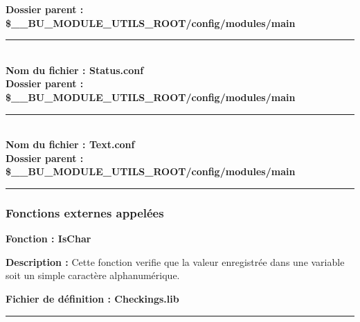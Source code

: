 \documentclass[a4paper,10pt]{article}
\begin{document}
\textbf{Dossier parent : \color{orange}\$\_\_BU\_MODULE\_UTILS\_ROOT\color{lime}/config/modules/main}\\[1\baselineskip]



\color{lime}\par\noindent\rule{\textwidth}{0.4pt}\color{white}\\[1\baselineskip]

\textbf{Nom du fichier : \color{lime}Status.conf}\\[1\baselineskip]

\textbf{Dossier parent : \color{orange}\$\_\_BU\_MODULE\_UTILS\_ROOT\color{lime}/config/modules/main}\\[1\baselineskip]



\color{lime}\par\noindent\rule{\textwidth}{0.4pt}\color{white}\\[1\baselineskip]

\textbf{Nom du fichier : \color{lime}Text.conf}\\[1\baselineskip]

\textbf{Dossier parent : \color{orange}\$\_\_BU\_MODULE\_UTILS\_ROOT\color{lime}/config/modules/main}\\[1\baselineskip]



\color{blue}\par\noindent\rule{\textwidth}{0.4pt}\color{white}

\color{blue}
\subsubsection{Fonctions externes appelées}\color{white}

\textbf{Fonction : \color{mauve}IsChar}\\[1\baselineskip]

\begin{justify}
    \textbf{Description :} Cette fonction verifie que la valeur enregistrée dans une variable soit un simple caractère alphanumérique.
\end{justify}

\textbf{Fichier de définition : \color{lime}Checkings.lib}\\[1\baselineskip]



\color{blue}\par\noindent\rule{\textwidth}{0.4pt}\color{white}
\end{document}
